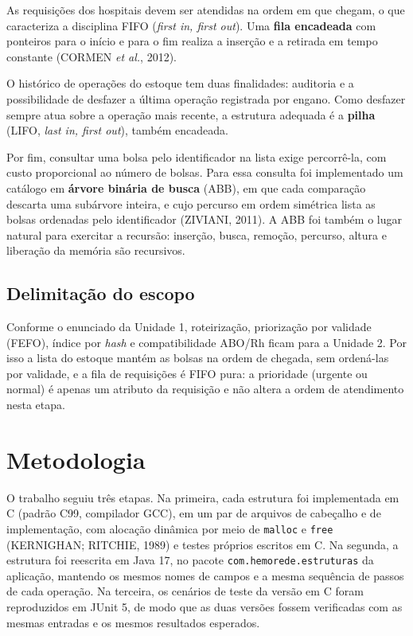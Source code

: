 \documentclass[12pt,a4paper,oneside]{report}
\newcommand{\cod}[1]{\texttt{#1}}
\begin{document}
As requisições dos hospitais devem ser atendidas na ordem em que chegam, o que caracteriza a disciplina FIFO (\textit{first in, first out}). Uma \textbf{fila encadeada} com ponteiros para o início e para o fim realiza a inserção e a retirada em tempo constante (CORMEN \textit{et al.}, 2012).

O histórico de operações do estoque tem duas finalidades: auditoria e a possibilidade de desfazer a última operação registrada por engano. Como desfazer sempre atua sobre a operação mais recente, a estrutura adequada é a \textbf{pilha} (LIFO, \textit{last in, first out}), também encadeada.

Por fim, consultar uma bolsa pelo identificador na lista exige percorrê-la, com custo proporcional ao número de bolsas. Para essa consulta foi implementado um catálogo em \textbf{árvore binária de busca} (ABB), em que cada comparação descarta uma subárvore inteira, e cujo percurso em ordem simétrica lista as bolsas ordenadas pelo identificador (ZIVIANI, 2011). A ABB foi também o lugar natural para exercitar a recursão: inserção, busca, remoção, percurso, altura e liberação da memória são recursivos.

\section{Delimitação do escopo}

Conforme o enunciado da Unidade 1, roteirização, priorização por validade (FEFO), índice por \textit{hash} e compatibilidade ABO/Rh ficam para a Unidade 2. Por isso a lista do estoque mantém as bolsas na ordem de chegada, sem ordená-las por validade, e a fila de requisições é FIFO pura: a prioridade (urgente ou normal) é apenas um atributo da requisição e não altera a ordem de atendimento nesta etapa.

\chapter{Metodologia}

O trabalho seguiu três etapas. Na primeira, cada estrutura foi implementada em C (padrão C99, compilador GCC), em um par de arquivos de cabeçalho e de implementação, com alocação dinâmica por meio de \cod{malloc} e \cod{free} (KERNIGHAN; RITCHIE, 1989) e testes próprios escritos em C. Na segunda, a estrutura foi reescrita em Java 17, no pacote \cod{com.hemorede.estruturas} da aplicação, mantendo os mesmos nomes de campos e a mesma sequência de passos de cada operação. Na terceira, os cenários de teste da versão em C foram reproduzidos em JUnit 5, de modo que as duas versões fossem verificadas com as mesmas entradas e os mesmos resultados esperados.
\end{document}
